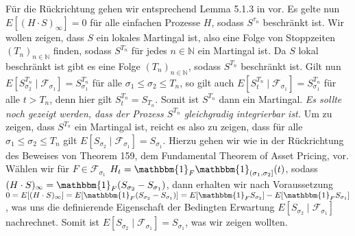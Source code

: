 \documentclass{article}
\begin{document}
Für die Rückrichtung gehen wir entsprechend Lemma 5.1.3 in \cite{Delbaen2006} vor.
Es gelte nun $E[(H\cdot S)_\infty]=0$ für alle einfachen Prozesse $H$, sodass $S^{\tau_n}$ beschränkt ist.
Wir wollen zeigen, dass $S$ ein lokales Martingal ist, also eine Folge von Stoppzeiten $(T_n)_{n\in\mathbb{N}}$ finden, sodass $S^{T_n}$ für jedes $n\in\mathbb{N}$ ein Martingal ist.
Da $S$ lokal beschränkt ist gibt es eine Folge $(T_n)_{n\in\mathbb{N}}$, sodass $S^{T_n}$ beschränkt ist.
Gilt nun $E[S_{\sigma_2}^{T_n}\mid \mathscr{F}_{\sigma_1}]=S^{T_n}_{\sigma_1}$ für alle $\sigma_1\leq\sigma_2\leq T_n$, so gilt auch $E[S^{T_n}_t\mid\mathscr{F}_{\sigma_1}]=S^{T_n}_{\sigma_1}$ für alle $t>T_n$, denn hier gilt $S^{T_n}_t=S_{T_n}$.
Somit ist $S^{T_n}$ dann ein Martingal.
\emph{Es sollte noch gezeigt werden, dass der Prozess $S^{T_n}$ gleichgradig integrierbar ist.}
Um zu zeigen, dass $S^{T_n}$ ein Martingal ist, reicht es also zu zeigen, dass für alle $\sigma_1\leq\sigma_2\leq T_n$ gilt $E[S_{\sigma_2}\mid\mathscr{F}_{\sigma_1}]=S_{\sigma_1}$.
Hierzu gehen wir wie in der Rückrichtung des Beweises von Theorem 159, dem Fundamental Theorem of Asset Pricing, vor.
Wählen wir für $F\in\mathscr{F}_{\sigma_1}$ $H_t=\mathbbm{1}_F\mathbbm{1}_{(\sigma_1,\sigma_2]}(t)$, sodass $(H\cdot S)_\infty=\mathbbm{1}_F(S_{\sigma_2}-S_{\sigma_1})$, dann erhalten wir nach Voraussetzung $0=E[(H\cdot S)_\infty]=E[\mathbbm{1}_F(S_{\sigma_2}-S_{\sigma_1})]=E[\mathbbm{1}_FS_{\sigma_2}]-E[\mathbbm{1}_FS_{\sigma_1}]$, was uns die definierende Eigenschaft der Bedingten Erwartung $E[S_{\sigma_2}\mid\mathscr{F}_{\sigma_1}]$ nachrechnet.
Somit ist $E[S_{\sigma_2}\mid\mathscr{F}_{\sigma_1}]=S_{\sigma_1}$, was wir zeigen wollten.


\end{document}
